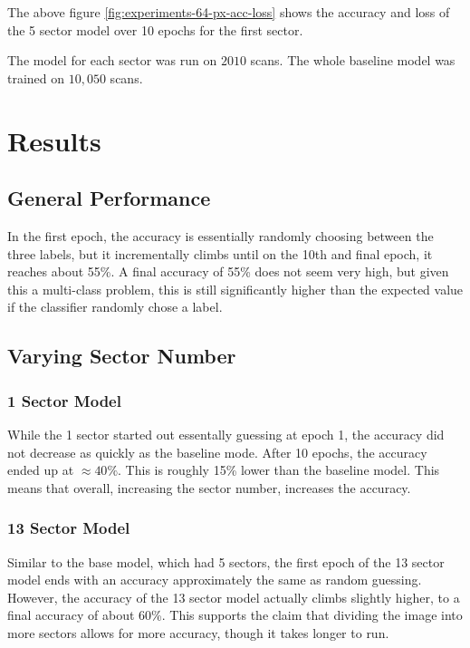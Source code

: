 \documentclass[10pt,twocolumn,letterpaper]{article}
\begin{document}
      The above figure \ref{fig:experiments-64-px-acc-loss} shows the accuracy and loss of the 5 sector model over 10 epochs for the first sector.

      The model for each sector was run on $2010$ scans. The whole baseline model was trained on $10,050$ scans.
\section{Results} \label{sec:results}

   \subsection{General Performance} \label{sec:results-general-performance}

      In the first epoch, the accuracy is essentially randomly choosing between the three labels, but it incrementally climbs until on the 10th and final epoch, it reaches about 55\%. A final accuracy of 55\% does not seem very high, but given this a multi-class problem, this is still significantly higher than the expected value if the classifier randomly chose a label.

   \subsection{Varying Sector Number} \label{sec:results-sector}

      \subsubsection{1 Sector Model} \label{sec:results-sector-1}
         While the 1 sector started out essentally guessing at epoch 1, the accuracy did not decrease as quickly as the baseline mode. After 10 epochs, the accuracy ended up at $\approx 40\%$. This is roughly 15\% lower than the baseline model. This means that overall, increasing the sector number, increases the accuracy.
      \subsubsection{13 Sector Model} \label{sec:results-sector-13}
         Similar to the base model, which had 5 sectors, the first epoch of the 13 sector model ends with an accuracy approximately the same as random guessing. However, the accuracy of the 13 sector model actually climbs slightly higher, to a final accuracy of about 60\%. This supports the claim that dividing the image into more sectors allows for more accuracy, though it takes longer to run. 
\end{document}
